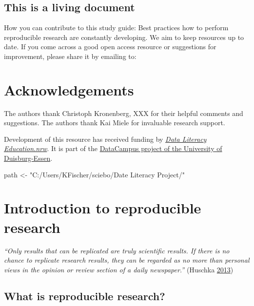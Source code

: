 \documentclass[
]{book}
\newenvironment{Shaded}{\begin{snugshade}}{\end{snugshade}}
\newcommand{\NormalTok}[1]{#1}
\newcommand{\StringTok}[1]{\textcolor[rgb]{0.31,0.60,0.02}{#1}}
\begin{document}
\hypertarget{this-is-a-living-document}{%
\section*{This is a living document}\label{this-is-a-living-document}}

How you can contribute to this study guide: Best practices how to
perform reproducible research are constantly developing. We aim to keep
resources up to date. If you come across a good open access resource or
suggestions for improvement, please share it by emailing to:

\hypertarget{acknowledgements}{%
\chapter*{Acknowledgements}\label{acknowledgements}}

The authors thank Christoph Kronenberg, XXX for their helpful comments
and suggestions. The authors thank Kai Miele for invaluable research
support.

Development of this resource has received funding by
\href{https://www.dh.nrw/aktuelles/ausschreibung}{\emph{Data Literacy
Education.nrw}}. It is part of the
\href{https://www.uni-due.de/ub/datacampus/index.php}{DataCampus project
of the University of Duisburg-Essen}.

\begin{Shaded}
\begin{Highlighting}[]
\NormalTok{path <-}\StringTok{ "C:/Users/KFischer/sciebo/Date Literacy Project/"}
\end{Highlighting}
\end{Shaded}

\hypertarget{intro}{%
\chapter{Introduction to reproducible research}\label{intro}}

\emph{``Only results that can be replicated are truly scientific
results. If there is no chance to replicate research results, they can
be regarded as no more than personal views in the opinion or review
section of a daily newspaper.''} (Huschka
\protect\hyperlink{ref-huschka_why_2013}{2013})

\hypertarget{what-is-reproducible-research}{%
\section{What is reproducible
research?}\label{what-is-reproducible-research}}
\end{document}
